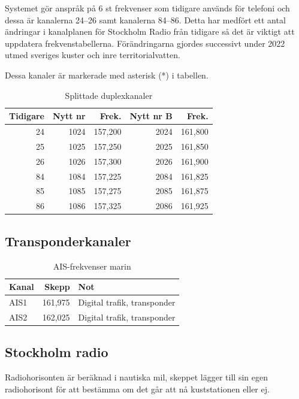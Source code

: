 Systemet gör anspråk på 6 st frekvenser som tidigare används för telefoni och
dessa är kanalerna 24--26 samt kanalerna 84--86. Detta har medfört ett antal
ändringar i kanalplanen för Stockholm Radio från tidigare så det är viktigt att
uppdatera frekvenstabellerna. Förändringarna gjordes successivt under 2022 utmed
sveriges kuster och inre territorialvatten.

Dessa kanaler är markerade med asterisk (*) i tabellen.

\begin{longtable}{rrrrr}
\caption{Splittade duplexkanaler} \\
\textbf{Tidigare} & \textbf{Nytt nr} & \textbf{Frek.} & \textbf{Nytt nr B} & \textbf{Frek.}\\
\hline \endhead

24 & 1024 & 157,200 & 2024 & 161,800 \\
25 & 1025 & 157,250 & 2025 & 161,850 \\
26 & 1026 & 157,300 & 2026 & 161,900 \\
84 & 1084 & 157,225 & 2084 & 161,825 \\
85 & 1085 & 157,275 & 2085 & 161,875 \\
86 & 1086 & 157,325 & 2086 & 161,925 \\

\end{longtable}

\subsection{Transponderkanaler}

\begin{table}[h]
\centering
\begin{tabular}{lrl}
	\textbf{Kanal} & \textbf{Skepp} & \textbf{Not}                \\ \hline
	AIS1           &        161,975 & Digital trafik, transponder \\
	AIS2           &        162,025 & Digital trafik, transponder
\end{tabular}
\caption{AIS-frekvenser marin}
\end{table}

\subsection{Stockholm radio}

Radiohorisonten är beräknad i nautiska mil, skeppet lägger till sin egen
radiohorisont för att bestämma om det går att nå kuststationen eller ej.

